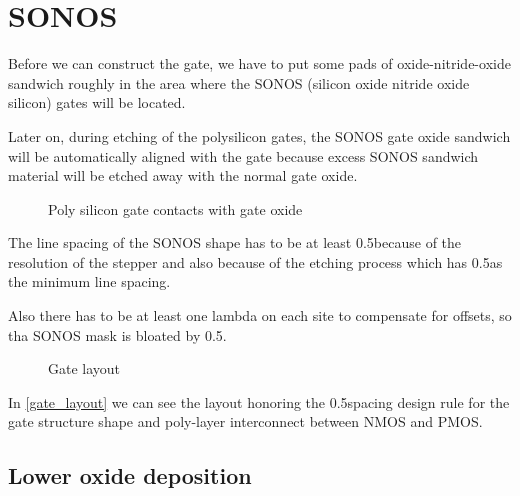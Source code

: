 \section{SONOS}\label{sonos_chapter}

Before we can construct the gate, we have to put some pads of oxide-nitride-oxide sandwich roughly in the area where the SONOS (silicon oxide nitride oxide silicon) gates will be located.

Later on, during etching of the polysilicon gates, the SONOS gate oxide sandwich will be automatically aligned with the gate because excess SONOS sandwich material will be etched away with the normal gate oxide.

\begin{figure}[H]
	\centering
	\begin{tikzpicture}[node distance = 3cm, auto, thick,scale=\CrossAndTopSectionBig, every node/.style={transform shape}]
		
	\end{tikzpicture}
	\begin{tikzpicture}[node distance = 3cm, auto, thick,scale=\CrossAndTopSectionBig, every node/.style={transform shape}]
		
	\end{tikzpicture}
	\caption{Poly silicon gate contacts with gate oxide}
\end{figure}

The line spacing of the SONOS shape has to be at least 0.5\um because of the resolution of the stepper and also because of the etching process which has 0.5\um as the minimum line spacing.

Also there has to be at least one lambda on each site to compensate for offsets, so tha SONOS mask is bloated by 0.5\um.


\begin{figure}[H]
	\centering
	\begin{tikzpicture}[node distance =1cm, auto, thick,scale=\VLSILayout, every node/.style={transform shape}]
		
	\end{tikzpicture}
	\caption{Gate layout}
	\label{gate_layout}
\end{figure}

In \autoref{gate_layout} we can see the layout honoring the 0.5\um spacing design rule for the gate structure shape and poly-layer interconnect between NMOS and PMOS.

\newpage

\subsection{Lower oxide deposition}\label{step_growing_gate_oxide}

